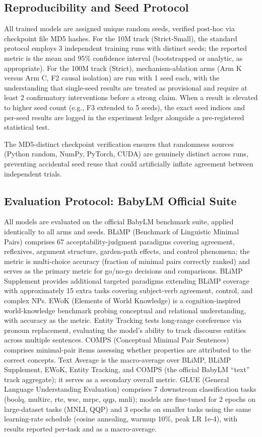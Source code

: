 \subsection{Reproducibility and Seed Protocol}

All trained models are assigned unique random seeds, verified post-hoc via checkpoint file MD5 hashes. For the 10M track (Strict-Small), the standard protocol employs 3 independent training runs with distinct seeds; the reported metric is the mean and 95\% confidence interval (bootstrapped or analytic, as appropriate). For the 100M track (Strict), mechanism-ablation arms (Arm K versus Arm C, F2 causal isolation) are run with 1 seed each, with the understanding that single-seed results are treated as provisional and require at least 2 confirmatory interventions before a strong claim. When a result is elevated to higher seed count (e.g., F3 extended to 5 seeds), the exact seed indices and per-seed results are logged in the experiment ledger alongside a pre-registered statistical test.

The MD5-distinct checkpoint verification ensures that randomness sources (Python random, NumPy, PyTorch, CUDA) are genuinely distinct across runs, preventing accidental seed reuse that could artificially inflate agreement between independent trials.

\subsection{Evaluation Protocol: BabyLM Official Suite}

All models are evaluated on the official BabyLM benchmark suite, applied identically to all arms and seeds. BLiMP (Benchmark of Linguistic Minimal Pairs) comprises 67 acceptability-judgment paradigms covering agreement, reflexives, argument structure, garden-path effects, and control phenomena; the metric is multi-choice accuracy (fraction of minimal pairs correctly ranked) and serves as the primary metric for go/no-go decisions and comparisons. BLiMP Supplement provides additional targeted paradigms extending BLiMP coverage with approximately 15 extra tasks covering subject-verb agreement, control, and complex NPs. EWoK (Elements of World Knowledge) is a cognition-inspired world-knowledge benchmark probing conceptual and relational understanding, with accuracy as the metric. Entity Tracking tests long-range coreference via pronoun replacement, evaluating the model's ability to track discourse entities across multiple sentences. COMPS (Conceptual Minimal Pair Sentences) comprises minimal-pair items assessing whether properties are attributed to the correct concepts. Text Average is the macro-average over BLiMP, BLiMP Supplement, EWoK, Entity Tracking, and COMPS (the official BabyLM ``text'' track aggregate); it serves as a secondary overall metric. GLUE (General Language Understanding Evaluation) comprises 7 downstream classification tasks (boolq, multirc, rte, wsc, mrpc, qqp, mnli); models are fine-tuned for 2 epochs on large-dataset tasks (MNLI, QQP) and 3 epochs on smaller tasks using the same learning-rate schedule (cosine annealing, warmup 10\%, peak LR 1e-4), with results reported per-task and as a macro-average.

